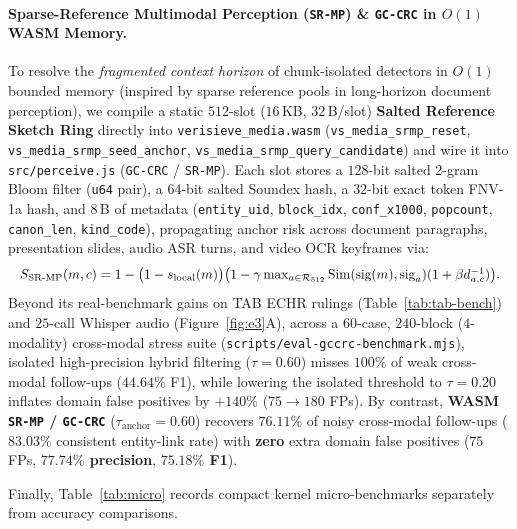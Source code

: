 \documentclass{article}
\begin{document}
\paragraph{Sparse-Reference Multimodal Perception (\texttt{SR-MP}) \& \texttt{GC-CRC} in $O(1)$ WASM Memory.}
To resolve the \emph{fragmented context horizon} of chunk-isolated detectors in $O(1)$ bounded memory (inspired by sparse reference pools in long-horizon document perception), we compile a static $512$-slot ($16$\,KB, $32$\,B/slot) \textbf{Salted Reference Sketch Ring} directly into \texttt{verisieve\_media.wasm} (\texttt{vs\_media\_srmp\_reset}, \texttt{vs\_media\_srmp\_seed\_anchor}, \texttt{vs\_media\_srmp\_query\_candidate}) and wire it into \texttt{src/perceive.js} (\texttt{GC-CRC} / \texttt{SR-MP}). Each slot stores a $128$-bit salted 2-gram Bloom filter (\texttt{u64} pair), a $64$-bit salted Soundex hash, a $32$-bit exact token FNV-1a hash, and $8$\,B of metadata (\texttt{entity\_uid}, \texttt{block\_idx}, \texttt{conf\_x1000}, \texttt{popcount}, \texttt{canon\_len}, \texttt{kind\_code}), propagating anchor risk across document paragraphs, presentation slides, audio ASR turns, and video OCR keyframes via:
\begin{equation}
\resizebox{\columnwidth}{!}{$S_{\text{SR-MP}}(m, c) = 1 - \bigl(1 - s_{\text{local}}(m)\bigr)\bigl(1 - \gamma \max_{a \in \mathcal{R}_{512}} \operatorname{Sim}(\text{sig}(m), \text{sig}_a)(1 + \beta d_{a,c}^{-1})\bigr).$}
\end{equation}
Beyond its real-benchmark gains on TAB ECHR rulings (Table~\ref{tab:tab-bench}) and $25$-call Whisper audio (Figure~\ref{fig:e3}A), across a $60$-case, $240$-block ($4$-modality) cross-modal stress suite (\texttt{scripts/eval-gccrc-benchmark.mjs}), isolated high-precision hybrid filtering ($\tau{=}0.60$) misses $100\%$ of weak cross-modal follow-ups ($44.64\%$ F1), while lowering the isolated threshold to $\tau{=}0.20$ inflates domain false positives by $+140\%$ ($75 \to 180$ FPs). By contrast, \textbf{WASM \texttt{SR-MP} / \texttt{GC-CRC}} ($\tau_{\text{anchor}}{=}0.60$) recovers \textbf{$76.11\%$} of noisy cross-modal follow-ups ($83.03\%$ consistent entity-link rate) with \textbf{zero} extra domain false positives ($75$ FPs, \textbf{$77.74\%$ precision}, \textbf{$75.18\%$ F1}).

Finally, Table~\ref{tab:micro} records compact kernel micro-benchmarks separately from accuracy comparisons.
\end{document}
